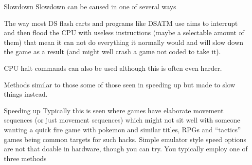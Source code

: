 \documentclass[
]{book}
\begin{document}
Slowdown Slowdown can be caused in one of several ways

The way most DS flash carts and programs like DSATM use aims to interrupt and then flood the CPU with useless instructions (maybe a selectable amount of them) that mean it can not do everything it normally would and will slow down the game as a result (and might well crash a game not coded to take it).

CPU halt commands can also be used although this is often even harder.

Methods similar to those some of those seen in speeding up but made to slow things instead.

Speeding up Typically this is seen where games have elaborate movement sequences (or just movement sequences) which might not sit well with someone wanting a quick fire game with pokemon and similar titles, RPGs and ``tactics'' games being common targets for such hacks. Simple emulator style speed options are not that doable in hardware, though you can try. You typically employ one of three methods
\end{document}
